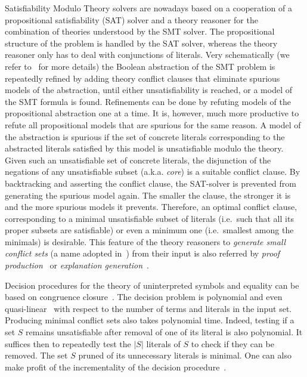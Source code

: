 \documentclass{easychair}
\begin{document}
Satisfiability Modulo Theory solvers are nowadays based on a cooperation of a
propositional satisfiability (SAT) solver and a theory reasoner for the
combination of theories understood by the SMT solver. The propositional
structure of the problem is handled by the SAT solver, whereas the theory
reasoner only has to deal with conjunctions of literals.  Very schematically (we
refer to~\cite{Barrett14} for more details) the Boolean abstraction of the SMT
problem is repeatedly refined by adding theory conflict clauses that eliminate
spurious models of the abstraction, until either unsatisfiability is reached, or
a model of the SMT formula is found.  Refinements can be done by refuting models
of the propositional abstraction one at a time.  It is, however, much more
productive to refute all propositional models that are spurious for the same
reason.  A model of the abstraction is spurious if the set of concrete literals
corresponding to the abstracted literals satisfied by this model is
unsatisfiable modulo the theory.  Given such an unsatisfiable set of concrete literals, the
disjunction of the negations of any unsatisfiable subset (a.k.a. \emph{core}) is a suitable
conflict clause.  By backtracking and asserting the conflict clause, the
SAT-solver is prevented from generating the spurious model again. The smaller
the clause, the stronger it is and the more spurious models it prevents.
Therefore, an optimal conflict clause, corresponding to a minimal unsatisfiable
subset of literals (i.e.\ such that all its proper subsets are satisfiable) or
even a minimum one (i.e.\ smallest among the minimals) is desirable.  This
feature of the theory reasoners to \emph{generate small conflict sets} (a name
adopted in~\cite{Barrett14}) from their input is also referred by \emph{proof
production}~\cite{Nieuwenhuis3,Nieuwenhuis9} or \emph{explanation
generation}~\cite{Nieuwenhuis6}.

Decision procedures for the theory of uninterpreted symbols and equality can be
based on congruence closure~\cite{Nelson2,Downey1,Nieuwenhuis6}.  The decision problem is polynomial
and even quasi-linear~\cite{Downey1} with respect to the number of terms and
literals in the input set.  Producing minimal conflict sets also takes
polynomial time.  Indeed, testing if a set $S$ remains unsatisfiable after
removal of one of its literal is also polynomial.  It suffices then to
repeatedly test the $|S|$ literals of $S$ to check if they can be removed.  The
set $S$ pruned of its unnecessary literals is minimal.  One can also make profit of the incrementality of the decision procedure~\cite{Fontaine1}.
\end{document}
